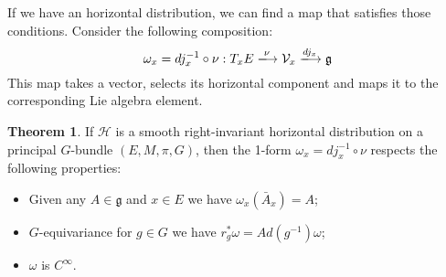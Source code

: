 \documentclass[12pt,a4paper]{report}
\theoremstyle{definition}
\theoremstyle{Theorem}
\newtheorem{Theo}[Def]{Theorem}
\theoremstyle{definition}
\theoremstyle{definition}
\begin{document}
		If we have an horizontal distribution, we can find a map that satisfies those conditions. Consider the following composition:
		$$\omega_{x}=dj_{x}^{-1}\circ \nu:T_{x}E\xlongrightarrow{\nu} \mathcal{V}_{x}\xlongrightarrow{dj_{x}}\mathfrak{g}$$
		This map takes a vector, selects its horizontal component and maps it to the corresponding Lie algebra element.
		\begin{Theo}
			If $\mathcal{H}$ is a smooth right-invariant horizontal distribution on a principal $G$-bundle $(E,M,\pi,G)$, then the 1-form $\omega_{x}=dj_{x}^{-1}\circ \nu$ respects the following properties:
			\begin{itemize}
				\item Given any $A\in\mathfrak{g}$ and $x\in E$ we have $\omega_{x}(\bar{A}_{x})=A$;
				\item $G$-equivariance for $g\in G$ we have $r^*_g\omega=Ad(g^{-1})\omega$;
				\item $\omega$ is $C^\infty$.
			\end{itemize}
		\end{Theo}
\end{document}
